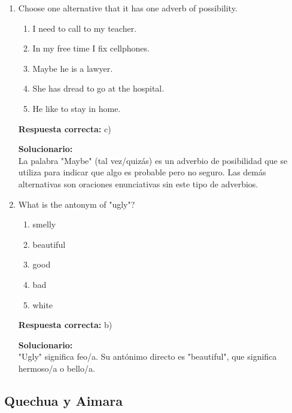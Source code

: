 \begin{enumerate}
	\item Choose one alternative that it has one adverb of possibility.
	\begin{enumerate}[label=\alph*)]
		\item I need to call to my teacher.
		\item In my free time I fix cellphones.
		\item Maybe he is a lawyer.
		\item She has dread to go at the hospital.
		\item He like to stay in home.
	\end{enumerate}
	\textbf{Respuesta correcta:} c)
	
	\vspace{2mm}
	\textbf{Solucionario:}\\
	La palabra "Maybe" (tal vez/quizás) es un adverbio de posibilidad que se utiliza para indicar que algo es probable pero no seguro. Las demás alternativas son oraciones enunciativas sin este tipo de adverbios.
	
	\vspace{6mm}
	
	\item What is the antonym of "ugly"?
	\begin{enumerate}[label=\alph*)]
		\item smelly
		\item beautiful
		\item good
		\item bad
		\item white
	\end{enumerate}
	\textbf{Respuesta correcta:} b)
	
	\vspace{2mm}
	\textbf{Solucionario:}\\
	"Ugly" significa feo/a. Su antónimo directo es "beautiful", que significa hermoso/a o bello/a.
	
	\vspace{6mm}
\end{enumerate}

\subsection*{Quechua y Aimara}


